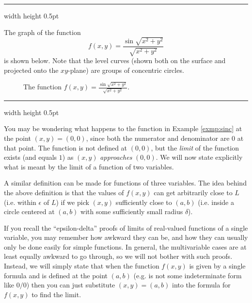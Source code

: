 \medskip
\hrule width \textwidth height 0.5pt
\begin{exmp}\label{exmp:sinc}
 The graph of the function
 \begin{displaymath}
  f(x,y) = \dfrac{\sin \sqrt{x^2 + y^2}}{\sqrt{x^2 + y^2}}
 \end{displaymath}
 is shown below. 
 Note that the level curves (shown both on the surface and projected onto the $xy$-plane) are groups
 of concentric circles.
 \begin{figure}[h]
 \begin{center}
  
 \end{center}
 \caption[]{\quad The function $f(x,y) = \frac{\sin \sqrt{x^2 + y^2}}{\sqrt{x^2 + y^2}}$.}
 \label{fig:sinc}
\end{figure}
\end{exmp}
\hrule width \textwidth height 0.5pt
\medskip

You may be wondering what happens to the function in Example \ref{exmp:sinc} at the point $(x,y) = (0,0)$, since both
the numerator and denominator are $0$ at that point. 
The function is not defined at $(0,0)$, but the
\emph{limit} of the function exists (and equals $1$) as $(x,y)$ \emph{approaches} $(0,0)$. 
We will now state explicitly
what is meant by the limit of a function of two variables.


A similar definition can be made for functions of three variables.
The idea behind the above definition is that the values of $f(x,y)$ can get arbitrarily close to $L$ (i.e. within $\epsilon$ of $L$) 
if we pick $(x,y)$ sufficiently close to $(a,b)$ (i.e. inside a circle centered at
$(a,b)$ with some sufficiently small radius $\delta$).

If you recall the ``epsilon-delta'' proofs of limits of real-valued functions of a single variable, you may remember
how awkward they can be, and how they can usually only be done easily for simple functions. 
In general, the
multivariable cases are at least equally awkward to go through, so we will not bother with such proofs. 
Instead, we
will simply state that when the function $f(x,y)$ is given by a single formula and is defined at the point
$(a,b)$ (e.g. is not some indeterminate form like $0/0$) then you can just substitute $(x,y) = (a,b)$ into the formula
for $f(x,y)$ to find the limit.

